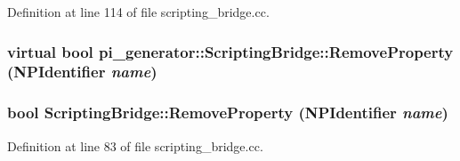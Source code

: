 Definition at line 114 of file scripting\_\-bridge.cc.

\hypertarget{classpi__generator_1_1_scripting_bridge_a5f317f9adabc7082079a919d1163cc09}{
\subsubsection[{RemoveProperty}]{\setlength{\rightskip}{0pt plus 5cm}virtual bool pi\_\-generator::ScriptingBridge::RemoveProperty (NPIdentifier {\em name})}}
\label{classpi__generator_1_1_scripting_bridge_a5f317f9adabc7082079a919d1163cc09}
\hypertarget{classpi__generator_1_1_scripting_bridge_a861437163b8291eb7b302ce8f778022d}{
\subsubsection[{RemoveProperty}]{\setlength{\rightskip}{0pt plus 5cm}bool ScriptingBridge::RemoveProperty (NPIdentifier {\em name})}}
\label{classpi__generator_1_1_scripting_bridge_a861437163b8291eb7b302ce8f778022d}


Definition at line 83 of file scripting\_\-bridge.cc.

